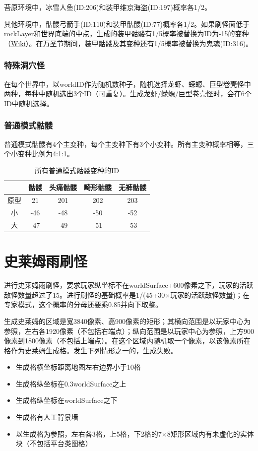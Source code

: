 苔原环境中，冰雪人鱼(ID:206)和装甲维京海盗(ID:197)概率各1/2。

其他环境中，骷髅弓箭手(ID:110)和装甲骷髅(ID:77)概率各1/2。如果刷怪面低于rockLayer和世界底端的中点，生成的装甲骷髅有1/5概率被替换为ID为-15的变种（\href{https://terraria-zh.gamepedia.com/装甲骷髅}{Wiki}）。在万圣节期间，装甲骷髅及其变种还有1/5概率被替换为鬼魂(ID:316)。

\subsubsection{特殊洞穴怪}\label{app20}
在每个世界中，以worldID作为随机数种子，随机选择龙虾、蝾螈、巨型卷壳怪中两种，每种中随机选出3个ID（可重复）。生成龙虾/蝾螈/巨型卷壳怪时，会在6个ID中随机选择。

\subsubsection{普通模式骷髅}\label{app21}
普通模式骷髅有4个主变种，每个主变种下有3个小变种。所有主变种概率相等，三个小变种比例为4:1:1。
\begin{table}[!h]
    \centering
    \begin{tabular}{c|cccc}
         &骷髅&头痛骷髅&畸形骷髅&无裤骷髅\\\hline
         原型&21 &201&202&203\\
         小  &-46&-48&-50&-52\\
         大  &-47&-49&-51&-53
    \end{tabular}
    \caption{所有普通模式骷髅变种的ID}
\end{table}

\section{史莱姆雨刷怪}
进行史莱姆雨刷怪，要求玩家纵坐标不在worldSurface+600像素之下，玩家的活跃敌怪数量超过了15。进行刷怪的基础概率是1/(45+30$\times$玩家的活跃敌怪数量)；在专家模式，这个概率的分母还要乘0.85并向下取整。

生成史莱姆的区域是宽3840像素、高900像素的矩形；其横向范围是以玩家中心为参照，左右各1920像素（不包括右端点）；纵向范围是以玩家中心为参照，上方900像素到1800像素（不包括上端点）。在这个区域内随机取一个像素，以该像素所在格作为史莱姆生成格。发生下列情形之一的，生成失败。

\begin{itemize}
    \item 生成格横坐标距离地图左右边界小于10格
    \item 生成格纵坐标在0.3worldSurface之上
    \item 生成格纵坐标在worldSurface之下
    \item 生成格有人工背景墙
    \item 以生成格为参照，左右各3格，上5格，下2格的7$\times$8矩形区域内有未虚化的实体块（不包括平台类图格）
\end{itemize}


